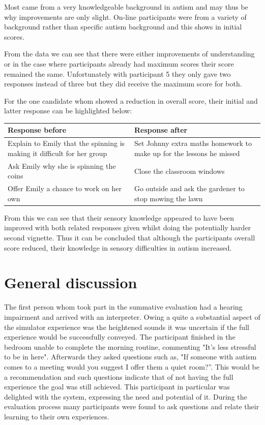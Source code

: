\documentclass[11pt]{report}
\begin{document}
Most came from a very knowledgeable background in autism and may thus be why improvements are only slight. On-line participants were from a variety of background rather than specific autism background and this shows in initial scores. 

From the data we can see that there were either improvements of understanding or in the case where participants already had maximum scores their score remained the same. Unfortunately with participant 5 they only gave two responses instead of three but they did receive the maximum score for both.

For the one candidate whom showed a reduction in overall score, their initial and latter response can be highlighted below:

\begin{table}[H]
    \begin{tabular}{| p{6cm} | p{6cm} |}
    \hline
    \textbf{Response before} & \textbf{Response after}  \\                                                                                                                                                                                    
	\hline
	\hline
	Explain to Emily that the spinning is making it difficult for her group & Set Johnny extra maths homework to make up for the lessons he missed \\ \hline
	Ask Emily why she is spinning the coins & Close the classroom windows \\ \hline
	Offer Emily a chance to work on her own & Go outside and ask the gardener to stop mowing the lawn \\ 
    \hline
    \end{tabular}
\end{table}

From this we can see that their sensory knowledge appeared to have been improved with both related responses given whilst doing the potentially harder second vignette. Thus it can be concluded that although the participants overall score reduced, their knowledge in sensory difficulties in autism increased. 


\section{General discussion}


The first person whom took part in the summative evaluation had a hearing impairment and arrived with an interpreter. Owing a quite a substantial aspect of the simulator experience was the heightened sounds it was uncertain if the full experience would be successfully conveyed. The participant finished in the bedroom unable to complete the morning routine, commenting "It's less stressful to be in here". Afterwards they asked questions such as, "If someone with autism comes to a meeting would you suggest I offer them a quiet room?”. This would be a recommendation and such questions indicate that of not having the full experience the goal was still achieved. This participant in particular was delighted with the system, expressing the need and potential of it. During the evaluation process many participants were found to ask questions and relate their learning to their own experiences.
\end{document}
